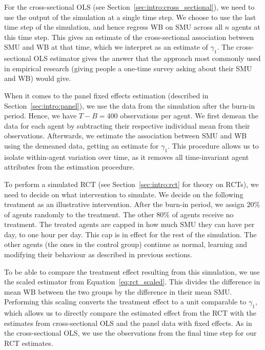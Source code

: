 For the cross-sectional OLS (see Section~\ref{sec:intro:cross_sectional}), we need to use the output of the simulation at a single time step. We choose to use the last time step of the simulation, and hence regress WB on SMU across all $n$ agents at this time step. This gives an estimate of the cross-sectional association between SMU and WB at that time, which we interpret as an estimate of $\gamma_1$. The cross-sectional OLS estimator gives the answer that the approach most commonly used in empirical research (giving people a one-time survey asking about their SMU and WB) would give.

When it comes to the panel fixed effects estimation (described in Section~\ref{sec:intro:panel}), we use the data from the simulation after the burn-in period. Hence, we have $T - B = 400$ observations per agent. We first demean the data for each agent by subtracting their respective individual mean from their observations. Afterwards, we estimate the association between SMU and WB using the demeaned data, getting an estimate for $\gamma_1$. This procedure allows us to isolate within-agent variation over time, as it removes all time-invariant agent attributes from the estimation procedure.

To perform a simulated RCT (see Section~\ref{sec:intro:rct} for theory on RCTs), we need to decide on what intervention to simulate. We decide on the following treatment as an illustrative intervention. After the burn-in period, we assign $20\%$ of agents randomly to the treatment. The other $80\%$ of agents receive no treatment. The treated agents are capped in how much SMU they can have per day, to one hour per day. This cap is in effect for the rest of the simulation. The other agents (the ones in the control group) continue as normal, learning and modifying their behaviour as described in previous sections.

To be able to compare the treatment effect resulting from this simulation, we use the scaled estimator from Equation~\eqref{eq:rct_scaled}. This divides the difference in mean WB between the two groups by the difference in their mean SMU\@. Performing this scaling converts the treatment effect to a unit comparable to $\gamma_1$, which allows us to directly compare the estimated effect from the RCT with the estimates from cross-sectional OLS and the panel data with fixed effects. As in the cross-sectional OLS, we use the observations from the final time step for our RCT estimates.

